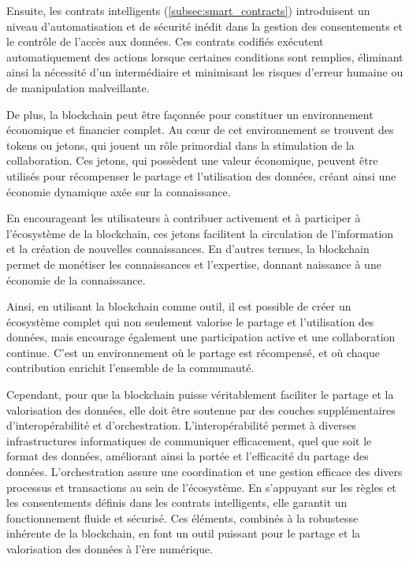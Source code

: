 Ensuite, les contrats intelligents (\ref{subsec:smart_contracts}) introduisent un niveau d'automatisation et de sécurité inédit dans la gestion des consentements et le contrôle de l'accès aux données. Ces contrats codifiés exécutent automatiquement des actions lorsque certaines conditions sont remplies, éliminant ainsi la nécessité d'un intermédiaire et minimisant les risques d'erreur humaine ou de manipulation malveillante.

De plus, la blockchain peut être façonnée pour constituer un environnement économique et financier complet. Au cœur de cet environnement se trouvent des tokens ou jetons, qui jouent un rôle primordial dans la stimulation de la collaboration. Ces jetons, qui possèdent une valeur économique, peuvent être utilisés pour récompenser le partage et l'utilisation des données, créant ainsi une économie dynamique axée sur la connaissance.

En encourageant les utilisateurs à contribuer activement et à participer à l'écosystème de la blockchain, ces jetons facilitent la circulation de l'information et la création de nouvelles connaissances. En d'autres termes, la blockchain permet de monétiser les connaissances et l'expertise, donnant naissance à une économie de la connaissance.

Ainsi, en utilisant la blockchain comme outil, il est possible de créer un écosystème complet qui non seulement valorise le partage et l'utilisation des données, mais encourage également une participation active et une collaboration continue. C'est un environnement où le partage est récompensé, et où chaque contribution enrichit l'ensemble de la communauté.

Cependant, pour que la blockchain puisse véritablement faciliter le partage et la valorisation des données, elle doit être soutenue par des couches supplémentaires d'interopérabilité et d'orchestration. L'interopérabilité permet à diverses infrastructures informatiques de communiquer efficacement, quel que soit le format des données, améliorant ainsi la portée et l'efficacité du partage des données. L'orchestration assure une coordination et une gestion efficace des divers processus et transactions au sein de l'écosystème. En s'appuyant sur les règles et les consentements définis dans les contrats intelligents, elle garantit un fonctionnement fluide et sécurisé. Ces éléments, combinés à la robustesse inhérente de la blockchain, en font un outil puissant pour le partage et la valorisation des données à l'ère numérique.


